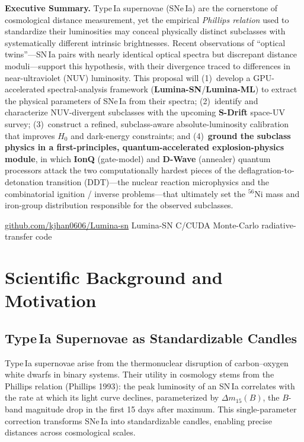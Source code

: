 \documentclass[11pt]{article}
\begin{document}
\begin{tcolorbox}[enhanced,colback=paleblue,colframe=stellar,boxrule=0pt,leftrule=4pt,
  arc=1pt,left=10pt,right=10pt,top=8pt,bottom=8pt]
{\bfseries\color{inkblue}Executive Summary.}\;
Type\,Ia supernovae (SNe\,Ia) are the cornerstone of cosmological distance measurement, yet the
empirical \emph{Phillips relation} used to standardize their luminosities may conceal physically
distinct subclasses with systematically different intrinsic brightnesses. Recent observations of
``optical twins''---SN\,Ia pairs with nearly identical optical spectra but discrepant distance
moduli---support this hypothesis, with their divergence traced to differences in near-ultraviolet
(NUV) luminosity. This proposal will (1)~develop a GPU-accelerated spectral-analysis framework
(\textbf{Lumina-SN}/\textbf{Lumina-ML}) to extract the physical parameters of SNe\,Ia from their
spectra; (2)~identify and characterize NUV-divergent subclasses with the upcoming \textbf{S-Drift}
space-UV survey; (3)~construct a refined, subclass-aware absolute-luminosity calibration that
improves $H_0$ and dark-energy constraints; and (4)~\textbf{ground the subclass physics in a
first-principles, quantum-accelerated explosion-physics module}, in which \textbf{IonQ}
(gate-model) and \textbf{D-Wave} (annealer) quantum processors attack the two computationally
hardest pieces of the deflagration-to-detonation transition (DDT)---the nuclear reaction
microphysics and the combinatorial ignition / inverse problems---that ultimately set the
$^{56}$Ni mass and iron-group distribution responsible for the observed subclasses.
\end{tcolorbox}

\vfill
{\footnotesize\color{rulegrey}\href{https://github.com/kjhan0606/Lumina-sn}{\color{stellar}github.com/kjhan0606/Lumina-sn} \;\textbar\; Lumina-SN C/CUDA Monte-Carlo radiative-transfer code}
\clearpage

\section{Scientific Background and Motivation}

\subsection{Type\,Ia Supernovae as Standardizable Candles}
Type\,Ia supernovae arise from the thermonuclear disruption of carbon--oxygen white dwarfs in
binary systems. Their utility in cosmology stems from the Phillips relation (Phillips 1993): the
peak luminosity of an SN\,Ia correlates with the rate at which its light curve declines,
parameterized by $\Delta m_{15}(B)$, the $B$-band magnitude drop in the first 15 days after
maximum. This single-parameter correction transforms SNe\,Ia into standardizable candles, enabling
precise distances across cosmological scales.
\end{document}
